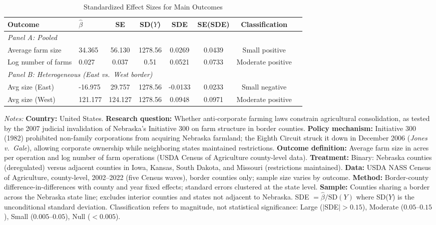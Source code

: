 \begin{table}[H]
\centering
\caption{Standardized Effect Sizes for Main Outcomes}
\label{tab:sde}
\begin{threeparttable}
\footnotesize
\begin{adjustbox}{max width=\textwidth}
\begin{tabular}{llcccccl}
\toprule
Outcome & $\hat{\beta}$ & SE & SD($Y$) & SDE & SE(SDE) & Classification \\
\midrule
\multicolumn{7}{l}{\textit{Panel A: Pooled}} \\
Average farm size & 34.365 & 56.130 & 1278.56 & 0.0269 & 0.0439 & Small positive \\
Log number of farms & 0.027 & 0.037 & 0.51 & 0.0521 & 0.0733 & Moderate positive \\
\midrule
\multicolumn{7}{l}{\textit{Panel B: Heterogeneous (East vs.\ West border)}} \\
Avg size (East) & -16.975 & 29.757 & 1278.56 & -0.0133 & 0.0233 & Small negative \\
Avg size (West) & 121.177 & 124.127 & 1278.56 & 0.0948 & 0.0971 & Moderate positive \\
\bottomrule
\end{tabular}
\end{adjustbox}
\begin{tablenotes}[flushleft]
\footnotesize
\item \textit{Notes:} \textbf{Country:} United States. \textbf{Research question:} Whether anti-corporate farming laws constrain agricultural consolidation, as tested by the 2007 judicial invalidation of Nebraska's Initiative 300 on farm structure in border counties. \textbf{Policy mechanism:} Initiative 300 (1982) prohibited non-family corporations from acquiring Nebraska farmland; the Eighth Circuit struck it down in December 2006 (\textit{Jones v.\ Gale}), allowing corporate ownership while neighboring states maintained restrictions. \textbf{Outcome definition:} Average farm size in acres per operation and log number of farm operations (USDA Census of Agriculture county-level data). \textbf{Treatment:} Binary: Nebraska counties (deregulated) versus adjacent counties in Iowa, Kansas, South Dakota, and Missouri (restrictions maintained). \textbf{Data:} USDA NASS Census of Agriculture, county-level, 2002--2022 (five Census waves), border counties only; sample size varies by outcome. \textbf{Method:} Border-county difference-in-differences with county and year fixed effects; standard errors clustered at the state level. \textbf{Sample:} Counties sharing a border across the Nebraska state line; excludes interior counties and states not adjacent to Nebraska. SDE $= \hat{\beta} / \text{SD}(Y)$ where SD($Y$) is the unconditional standard deviation. Classification refers to magnitude, not statistical significance: Large ($|$SDE$| > 0.15$), Moderate ($0.05$--$0.15$), Small ($0.005$--$0.05$), Null ($< 0.005$).
\end{tablenotes}
\end{threeparttable}
\end{table}
